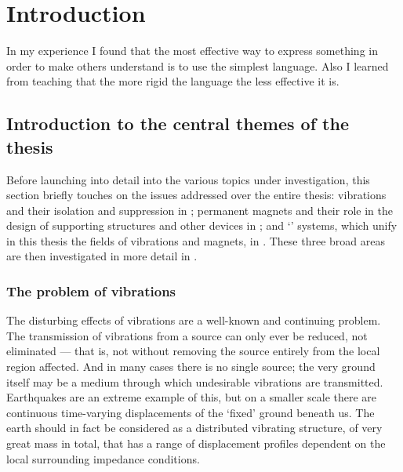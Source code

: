 
\chapter{Introduction}

\epigraph{In my experience I found that the most effective way to express
something in order to make others understand is to use the simplest language.
Also I learned from teaching that the more rigid the language the less
effective it is.}{\textcite{mahathera1990}}

\section{Introduction to the central themes of the thesis}

Before launching into detail into the various topics under investigation, this
section briefly touches on the issues addressed over the entire thesis:
vibrations and their isolation and suppression in
; permanent magnets and their role in the
design of supporting structures and other devices in
; and `\qzs' systems, which unify in this thesis
the fields of vibrations and magnets, in . These
three broad areas are then investigated in more detail in .

\subsection{The problem of vibrations}

The disturbing effects of vibrations are a well-known and continuing problem.
The transmission of vibrations from a source can only ever be reduced, not eliminated — that is, not without removing the source entirely from the local region affected. And in many cases there is no single source; the very ground itself may be a medium through which undesirable vibrations are transmitted.
Earthquakes are an extreme example of this, but on a smaller scale there are continuous time-varying displacements of the `fixed' ground beneath us.
The earth should in fact be considered as a distributed vibrating structure, of very great mass in total, that has a range of displacement profiles dependent on the local surrounding impedance conditions. 

